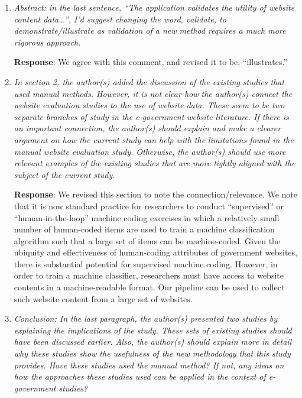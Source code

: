 \documentclass[12pt,titlepage]{article}
\begin{document}
\begin{enumerate}


\item \emph{ Abstract: in the last sentence, “The application validates the utility of website content data…”, I’d suggest changing the word, validate, to demonstrate/illustrate as validation of a new method requires a much more rigorous approach. } 

	\textbf{Response}: We agree with this comment, and revised it to be, ``illustrates.''
	
	\item \emph{ In section 2, the author(s) added the discussion of the existing studies that used manual methods. However, it is not clear how the author(s) connect the website evaluation studies to the use of website data. These seem to be two separate branches of study in the e-government website literature. If there is an important connection, the author(s) should explain and make a clearer argument on how the current study can help with the limitations found in the manual website evaluation study. Otherwise, the author(s) should use more relevant examples of the existing studies that are more tightly aligned with the subject of the current study. } 

	\textbf{Response}:  We revised this section to note the connection/relevance. We note that it is now standard practice for researchers to conduct ``supervised'' or ``human-in-the-loop'' machine coding exercises in which a relatively small number of human-coded items are used to train a machine classification algorithm such that a large set of items can be machine-coded. Given the ubiquity and effectiveness of human-coding attributes of government websites, there is substantial potential for supervised machine coding. However, in order to train a machine classifier, researchers must have access to website contents in a machine-readable format. Our pipeline can be used to collect such website content from a large set of websites.
	
	\item \emph{ Conclusion: In the last paragraph, the author(s) presented two studies by explaining the implications of the study. These sets of existing studies should have been discussed earlier. Also, the author(s) should explain more in detail why these studies show the usefulness of the new methodology that this study provides. Have these studies used the manual method? If not, any ideas on how the approaches these studies used can be applied in the context of e-government studies? } 


\end{enumerate}
\end{document}
